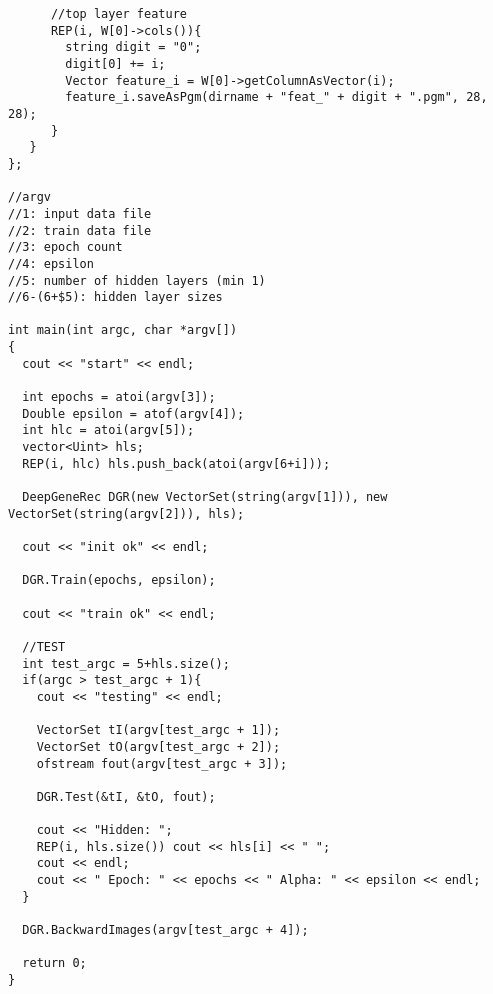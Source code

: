 \begin{lstlisting}
      //top layer feature
      REP(i, W[0]->cols()){
        string digit = "0";
        digit[0] += i; 
        Vector feature_i = W[0]->getColumnAsVector(i);
        feature_i.saveAsPgm(dirname + "feat_" + digit + ".pgm", 28, 28);
      }
   }
};

//argv
//1: input data file
//2: train data file
//3: epoch count
//4: epsilon
//5: number of hidden layers (min 1)
//6-(6+$5): hidden layer sizes

int main(int argc, char *argv[])
{
  cout << "start" << endl;
  
  int epochs = atoi(argv[3]);
  Double epsilon = atof(argv[4]); 
  int hlc = atoi(argv[5]); 
  vector<Uint> hls; 
  REP(i, hlc) hls.push_back(atoi(argv[6+i])); 
  
  DeepGeneRec DGR(new VectorSet(string(argv[1])), new VectorSet(string(argv[2])), hls);
  
  cout << "init ok" << endl;
  
  DGR.Train(epochs, epsilon);
  
  cout << "train ok" << endl;
 
  //TEST
  int test_argc = 5+hls.size(); 
  if(argc > test_argc + 1){
    cout << "testing" << endl;
  
    VectorSet tI(argv[test_argc + 1]);
    VectorSet tO(argv[test_argc + 2]); 
    ofstream fout(argv[test_argc + 3]); 
    
    DGR.Test(&tI, &tO, fout); 
    
    cout << "Hidden: ";
    REP(i, hls.size()) cout << hls[i] << " ";
    cout << endl;
    cout << " Epoch: " << epochs << " Alpha: " << epsilon << endl;
  }
   
  DGR.BackwardImages(argv[test_argc + 4]); 
  
  return 0;
}
\end{lstlisting}

